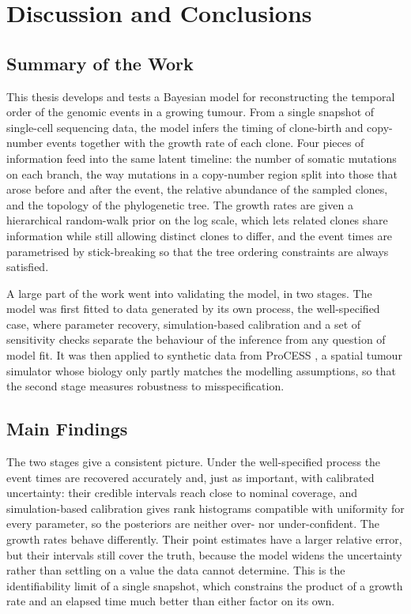 \chapter{Discussion and Conclusions}

\section{Summary of the Work}

This thesis develops and tests a Bayesian model for reconstructing the temporal
order of the genomic events in a growing tumour. From a single snapshot of
single-cell sequencing data, the model infers the timing of clone-birth and
copy-number events together with the growth rate of each clone. Four pieces of
information feed into the same latent timeline: the number of somatic mutations on
each branch, the way mutations in a copy-number region split into those that arose
before and after the event, the relative abundance of the sampled clones, and the
topology of the phylogenetic tree. The growth rates are given a hierarchical
random-walk prior on the log scale, which lets related clones share information
while still allowing distinct clones to differ, and the event times are
parametrised by stick-breaking so that the tree ordering constraints are always
satisfied.

A large part of the work went into validating the model, in two stages. The model
was first fitted to data generated by its own process, the well-specified case,
where parameter recovery, simulation-based calibration and a set of sensitivity
checks separate the behaviour of the inference from any question of model fit. It
was then applied to synthetic data from ProCESS \parencite{process}, a spatial
tumour simulator whose biology only partly matches the modelling assumptions, so
that the second stage measures robustness to misspecification.

\section{Main Findings}

The two stages give a consistent picture. Under the well-specified process the
event times are recovered accurately and, just as important, with calibrated
uncertainty: their credible intervals reach close to nominal coverage, and
simulation-based calibration \parencite{talts2018validating} gives rank histograms
compatible with uniformity for every parameter, so the posteriors are neither
over- nor under-confident. The growth rates behave differently. Their point
estimates have a larger relative error, but their intervals still cover the truth,
because the model widens the uncertainty rather than settling on a value the data
cannot determine. This is the identifiability limit of a single snapshot, which
constrains the product of a growth rate and an elapsed time much better than either
factor on its own.

